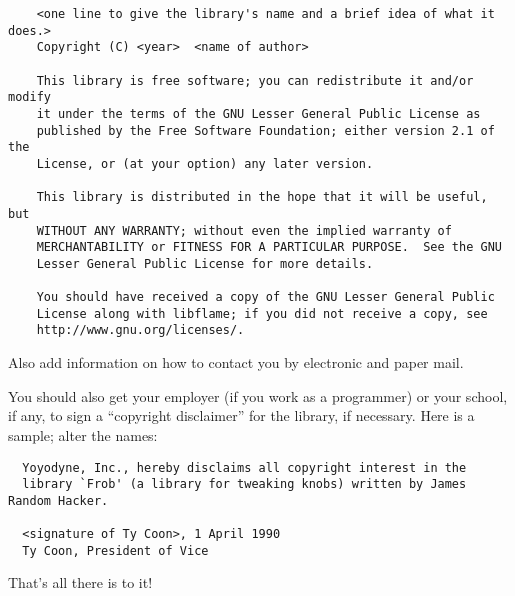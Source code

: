 \begin{enumerate}
{\footnotesize
\begin{verbatim}
    <one line to give the library's name and a brief idea of what it does.>
    Copyright (C) <year>  <name of author>

    This library is free software; you can redistribute it and/or modify
    it under the terms of the GNU Lesser General Public License as
    published by the Free Software Foundation; either version 2.1 of the
    License, or (at your option) any later version.

    This library is distributed in the hope that it will be useful, but
    WITHOUT ANY WARRANTY; without even the implied warranty of
    MERCHANTABILITY or FITNESS FOR A PARTICULAR PURPOSE.  See the GNU
    Lesser General Public License for more details.

    You should have received a copy of the GNU Lesser General Public
    License along with libflame; if you did not receive a copy, see
    http://www.gnu.org/licenses/.
\end{verbatim}
}

Also add information on how to contact you by electronic and paper mail.

You should also get your employer (if you work as a programmer) or your
school, if any, to sign a ``copyright disclaimer'' for the library, if
necessary.  Here is a sample; alter the names:

{\footnotesize
\begin{verbatim}
  Yoyodyne, Inc., hereby disclaims all copyright interest in the
  library `Frob' (a library for tweaking knobs) written by James Random Hacker.

  <signature of Ty Coon>, 1 April 1990
  Ty Coon, President of Vice
\end{verbatim}
}

That's all there is to it!

\end{enumerate}
